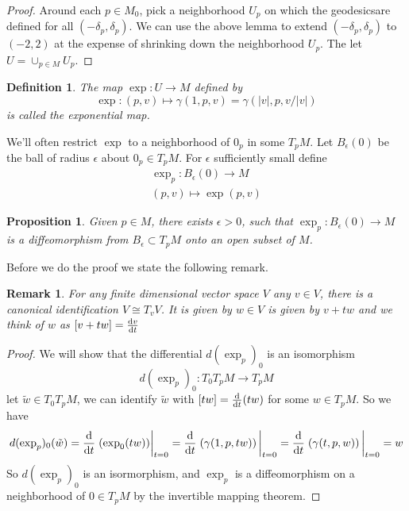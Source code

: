 \documentclass[a4paper]{article}
\newtheorem*{prop}{Proposition}
\newtheorem*{defn}{Definition}
\newtheorem*{rem}{Remark}
\begin{document}
\begin{proof}
  Around each $p \in M_0$, pick a neighborhood $U_p$ on which the geodesicsare defined for all $(-\delta_p, \delta_p)$. We can use the above lemma to extend $(-\delta_p, \delta_p)$ to $(-2, 2)$ at the expense of shrinking down the neighborhood $U_p$. The let $U = \cup_{p \in M} U_p$.
\end{proof}

\begin{defn}
  The map $\exp: U \rightarrow M$ defined by 
  \[
    \exp: (p,v) \mapsto \gamma(1, p, v) =  \gamma(|v|, p, v/|v|)
  \]
  is called the exponential map.
\end{defn}
We'll often restrict $\exp$ to a neighborhood of $0_p$ in some $T_pM$. Let $B_{\epsilon}(0)$ be the ball of radius $\epsilon$ about $0_p \in T_pM$. For $\epsilon$ sufficiently small define 
\[
  \begin{aligned}
    \exp_p: B_{\epsilon}(0) \rightarrow M \\
    (p,v) \mapsto \exp(p,v)
  \end{aligned}
\]

\begin{prop}
  Given $p \in M$, there exists $\epsilon > 0$, such that $\exp_p: B_{\epsilon}(0) \rightarrow M$ is a diffeomorphism from $B_{\epsilon} \subset T_pM$ onto an open subset of $M$. 
\end{prop}

Before we do the proof we state the following remark.

\begin{rem}
  For any finite dimensional vector space $V$ any $v \in V$, there is a canonical identification $ V \cong T_vV$. It is given by $w \in V$ is given by $v + tw$ and we think of $w$ as $[v + tw] = \dv{v}{t} (v + tw)$ 
\end{rem}

\begin{proof}
  We will show that the differential $d (\exp_p)_0$ is an isomorphism
  \[
    d(\exp_p)_0 : T_0T_pM \rightarrow T_pM
  \]
  let $\tilde{w} \in T_0T_pM$, we can identify $\tilde{w}$ with $[tw] = \dv{t}(tw)$ for some $w \in T_pM$. So we have
  \[
    d(\exp_p)_0(\tilde{w}) = \dv{t}\eval{(\exp_0(tw))}_{t=0} = \dv{t} \eval{\left( \gamma(1, p, tw)\right)}_{t=0} = \dv{t} \eval{\left( \gamma(t, p, w) \right)}_{t=0} = w
  \]
  So $d(\exp_p)_0$ is an isormorphism, and $\exp_p$ is a diffeomorphism on a neighborhood of $0 \in T_pM$ by the invertible mapping theorem.
\end{proof}
\end{document}
